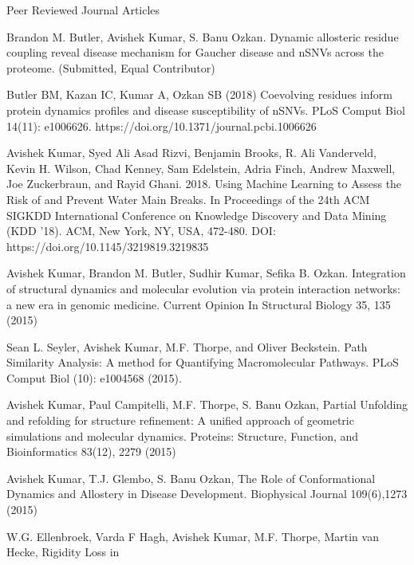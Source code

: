 \begin{cventries}
\cventry
    {}
    {Peer Reviewed Journal Articles}
    {}
    {}
    {
\begin{cvitems}
    \setlength\itemsep{1em}
    \item Brandon M. Butler, Avishek Kumar, S. Banu Ozkan. Dynamic allosteric residue coupling reveal disease mechanism for Gaucher disease and nSNVs across the proteome. (Submitted, Equal Contributor)
    \item Butler BM, Kazan IC, Kumar A, Ozkan SB (2018) Coevolving residues inform protein dynamics profiles and disease susceptibility of nSNVs. PLoS Comput Biol 14(11): e1006626. https://doi.org/10.1371/journal.pcbi.1006626
    \item Avishek Kumar, Syed Ali Asad Rizvi, Benjamin Brooks, R. Ali Vanderveld, Kevin H. Wilson, Chad
Kenney, Sam Edelstein, Adria Finch, Andrew Maxwell, Joe Zuckerbraun, and Rayid Ghani. 2018.
Using Machine Learning to Assess the Risk of and Prevent Water Main Breaks. In Proceedings of the
24th ACM SIGKDD International Conference on Knowledge Discovery and Data Mining (KDD '18).
ACM, New York, NY, USA, 472-480. DOI: https://doi.org/10.1145/3219819.3219835
    \item Avishek Kumar, Brandon M. Butler, Sudhir Kumar, Sefika B. Ozkan. Integration of structural
dynamics and molecular evolution via protein interaction networks: a new era in genomic medicine.
Current Opinion In Structural Biology 35, 135 (2015)
    \item Sean L. Seyler, Avishek Kumar, M.F. Thorpe, and Oliver Beckstein. Path Similarity Analysis: A
method for Quantifying Macromolecular Pathways. PLoS Comput Biol (10): e1004568 (2015).
    \item Avishek Kumar, Paul Campitelli, M.F. Thorpe, S. Banu Ozkan, Partial Unfolding and refolding for
structure refinement: A unified approach of geometric simulations and molecular dynamics. Proteins:
Structure, Function, and Bioinformatics 83(12), 2279 (2015)
    \item Avishek Kumar, T.J. Glembo, S. Banu Ozkan, The Role of Conformational Dynamics and Allostery in
Disease Development. Biophysical Journal 109(6),1273 (2015)
    \item W.G. Ellenbroek, Varda F Hagh, Avishek Kumar, M.F. Thorpe, Martin van Hecke, Rigidity Loss in

\end{cvitems}}
\end{cventries}
